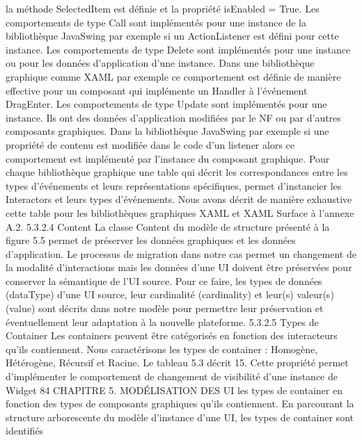 \documentclass{article}
\begin{document}
la m\'{e}thode SelectedItem est d\'{e}ﬁnie et la propri\'{e}t\'{e} isEnabled = True.
Les comportements de type Call sont impl\'{e}ment\'{e}s pour une instance de la biblioth\`{e}que JavaSwing
par exemple si un ActionListener est d\'{e}ﬁni pour cette instance.
Les comportements de type Delete sont impl\'{e}ment\'{e}s pour une instance ou pour les donn\'{e}es d’application d’une instance. Dans une biblioth\`{e}que graphique comme XAML par exemple ce comportement est d\'{e}ﬁnie de mani\`{e}re effective pour un composant qui impl\'{e}mente un Handler \`{a} l’\'{e}v\'{e}nement
DragEnter.
Les comportements de type Update sont impl\'{e}ment\'{e}s pour une instance. Ils ont des donn\'{e}es d’application modiﬁ\'{e}es par le NF ou par d’autres composants graphiques. Dans la biblioth\`{e}que JavaSwing
par exemple si une propri\'{e}t\'{e} de contenu est modiﬁ\'{e}e dans le code d’un listener alors ce comportement
est impl\'{e}ment\'{e} par l’instance du composant graphique.
Pour chaque biblioth\`{e}que graphique une table qui d\'{e}crit les correspondances entre les types d’\'{e}v\'{e}nements et leurs repr\'{e}sentations sp\'{e}ciﬁques, permet d’instancier les Interactors et leurs types d’\'{e}v\'{e}nements. Nous avons d\'{e}crit de mani\`{e}re exhaustive cette table pour les biblioth\`{e}ques graphiques XAML
et XAML Surface \`{a} l’annexe A.2.
5.3.2.4
Content
La classe Content du mod\`{e}le de structure pr\'{e}sent\'{e} \`{a} la ﬁgure 5.5 permet de pr\'{e}server les donn\'{e}es
graphiques et les donn\'{e}es d’application. Le processus de migration dans notre cas permet un changement de la modalit\'{e} d’interactions mais les donn\'{e}es d’une UI doivent \^{e}tre pr\'{e}serv\'{e}es pour conserver
la s\'{e}mantique de l’UI source. Pour ce faire, les types de donn\'{e}es (dataType) d’une UI source, leur
cardinalit\'{e} (cardinality) et leur(s) valeur(s) (value) sont d\'{e}crits dans notre mod\`{e}le pour permettre leur
pr\'{e}servation et \'{e}ventuellement leur adaptation \`{a} la nouvelle plateforme.
5.3.2.5
Types de Container
Les containers peuvent \^{e}tre cat\'{e}goris\'{e}s en fonction des interacteurs qu’ils contiennent. Nous caract\'{e}risons les types de container : Homog\`{e}ne, H\'{e}t\'{e}rog\`{e}ne, R\'{e}cursif et Racine. Le tableau 5.3 d\'{e}crit
15. Cette propri\'{e}t\'{e} permet d’impl\'{e}menter le comportement de changement de visibilit\'{e} d’une instance de Widget
84
CHAPITRE 5. MODÉLISATION DES UI
les types de container en fonction des types de composants graphiques qu’ils contiennent. En parcourant la structure arborescente du mod\`{e}le d’instance d’une UI, les types de container sont identiﬁ\'{e}s
\end{document}
